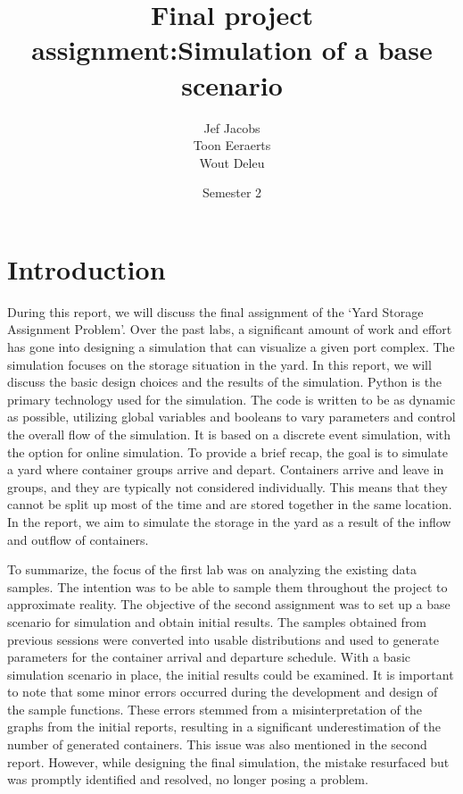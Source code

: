 \documentclass{article}
\title{Final project assignment:\@ Simulation of a base scenario }
\author{Jef Jacobs \\ Toon Eeraerts \\ Wout Deleu}
\date{Semester 2}
\begin{document}
\setlength{\parindent}{0pt} \maketitle \tableofcontents \newpage %

\maketitle
\newpage

\section{Introduction}
During this report, we will discuss the final assignment of the `Yard Storage
Assignment Problem'. Over the past labs, a significant amount of work and
effort has gone into designing a simulation that can visualize a given port
complex. The simulation focuses on the storage situation in the yard. In this
report, we will discuss the basic design choices and the results of the
simulation. Python is the primary technology used for the simulation. The code
is written to be as dynamic as possible, utilizing global variables and
booleans to vary parameters and control the overall flow of the simulation. It
is based on a discrete event simulation, with the option for online simulation.
To provide a brief recap, the goal is to simulate a yard where container groups
arrive and depart. Containers arrive and leave in groups, and they are
typically not considered individually. This means that they cannot be split up
most of the time and are stored together in the same location. In the report,
we aim to simulate the storage in the yard as a result of the inflow and
outflow of containers.

To summarize, the focus of the first lab was on analyzing the existing data
samples. The intention was to be able to sample them throughout the project to
approximate reality. The objective of the second assignment was to set up a
base scenario for simulation and obtain initial results. The samples obtained
from previous sessions were converted into usable distributions and used to
generate parameters for the container arrival and departure schedule. With a
basic simulation scenario in place, the initial results could be examined. It
is important to note that some minor errors occurred during the development and
design of the sample functions. These errors stemmed from a misinterpretation
of the graphs from the initial reports, resulting in a significant
underestimation of the number of generated containers. This issue was also
mentioned in the second report. However, while designing the final simulation,
the mistake resurfaced but was promptly identified and resolved, no longer
posing a problem.
\end{document}
